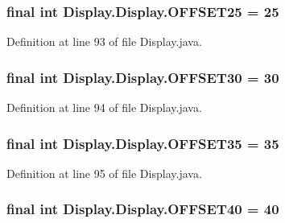 \subsubsection[{O\+F\+F\+S\+E\+T25}]{\setlength{\rightskip}{0pt plus 5cm}final int Display.\+Display.\+O\+F\+F\+S\+E\+T25 = 25\hspace{0.3cm}{\ttfamily [static]}}\label{class_display_1_1_display_af6173975e03ce9913d8935d6f8040e5b}


Definition at line 93 of file Display.\+java.

\hypertarget{class_display_1_1_display_afbede7d7429e2ed899ae713864da8848}{}
\subsubsection[{O\+F\+F\+S\+E\+T30}]{\setlength{\rightskip}{0pt plus 5cm}final int Display.\+Display.\+O\+F\+F\+S\+E\+T30 = 30\hspace{0.3cm}{\ttfamily [static]}}\label{class_display_1_1_display_afbede7d7429e2ed899ae713864da8848}


Definition at line 94 of file Display.\+java.

\hypertarget{class_display_1_1_display_a9b88a4d575cdcdcfe550deeac1c147f4}{}
\subsubsection[{O\+F\+F\+S\+E\+T35}]{\setlength{\rightskip}{0pt plus 5cm}final int Display.\+Display.\+O\+F\+F\+S\+E\+T35 = 35\hspace{0.3cm}{\ttfamily [static]}}\label{class_display_1_1_display_a9b88a4d575cdcdcfe550deeac1c147f4}


Definition at line 95 of file Display.\+java.

\hypertarget{class_display_1_1_display_a6c71cd05e79a2e66cac7ac49d8a627b0}{}
\subsubsection[{O\+F\+F\+S\+E\+T40}]{\setlength{\rightskip}{0pt plus 5cm}final int Display.\+Display.\+O\+F\+F\+S\+E\+T40 = 40\hspace{0.3cm}{\ttfamily [static]}}\label{class_display_1_1_display_a6c71cd05e79a2e66cac7ac49d8a627b0}



